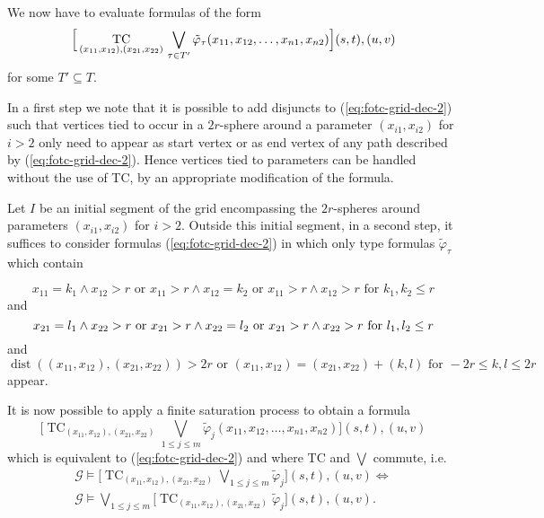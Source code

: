 \documentclass{LMCS}
\renewcommand{\phi}{\varphi}
\DeclareMathOperator{\TC}{TC}
\DeclareMathOperator{\dist}{dist}
\begin{document}
We now have to evaluate formulas of the form 
\begin{equation}\label{eq:fotc-grid-dec-2}
\Big[ \TC_{(x_{11},x_{12}),(x_{21},x_{22})} \\ \bigvee_{\tau \in T'} 
\tilde\phi_\tau(x_{11},x_{12},\ldots,x_{n1},x_{n2})\Big](s,t),(u,v)
\end{equation}
for some $T' \subseteq T$.

In a first step we note that it is possible to add disjuncts to (\ref{eq:fotc-grid-dec-2})
such that vertices tied to occur in a $2r$-sphere around a parameter $(x_{i1},x_{i2})$ for $i>2$
only need to appear as start vertex or as end vertex of any path described by (\ref{eq:fotc-grid-dec-2}).
Hence vertices tied to parameters can be handled without the use of TC, by an appropriate 
modification of the formula.

Let $I$ be an initial segment of the grid encompassing the $2r$-spheres around parameters 
$(x_{i1},x_{i2})$ for $i>2$. Outside this initial segment, in a second step, it suffices to 
consider formulas (\ref{eq:fotc-grid-dec-2}) in which only type formulas $\tilde\phi_\tau$
which contain

\[
 x_{11} = k_1  \wedge x_{12}>r  \text{ or }  x_{11}>r  \wedge x_{12}=k_2 \text{ or }  x_{11} >r  \wedge x_{12}>r 
 \text{ for } k_1,k_2 \le r
\]
and 
\[
 x_{21}=l_1 \wedge x_{22}>r  \text{ or }  x_{21}>r  \wedge x_{22}=l_2 \\
 \text{ or }  x_{21} >r  \wedge x_{22}>r 
 \text{ for } l_1,l_2 \le r
\] 
and
\[
 \dist((x_{11},x_{12}),(x_{21},x_{22})) >2r 
 \text{ or } (x_{11},x_{12}) = (x_{21},x_{22})+(k,l) 
 \text{ for } -2r \le k,l \le 2r
\] 
appear.

It is now possible to apply a finite saturation process to obtain a formula
\begin{equation}\label{eq:fotc-grid-dec-3}
\Big[ \TC_{(x_{11},x_{12}),(x_{21},x_{22})} \bigvee_{1 \le j \le m} 
\tilde\phi_j(x_{11},x_{12},\ldots,x_{n1},x_{n2})\Big](s,t),(u,v)
\end{equation}
which is equivalent to (\ref{eq:fotc-grid-dec-2}) and where TC and $\bigvee$ commute, i.e.
\begin{multline*}
 \mathcal G \models \Big[\TC_{(x_{11},x_{12}),(x_{21},x_{22})} \bigvee_{1 \le j \le m} \tilde\phi_j \Big](s,t),(u,v)
   \Leftrightarrow \\
 \mathcal G \models \bigvee_{1 \le j \le m} \Big[ \TC_{(x_{11},x_{12}),(x_{21},x_{22})} \tilde\phi_j \Big](s,t),(u,v).
\end{multline*}
 
\end{document}
